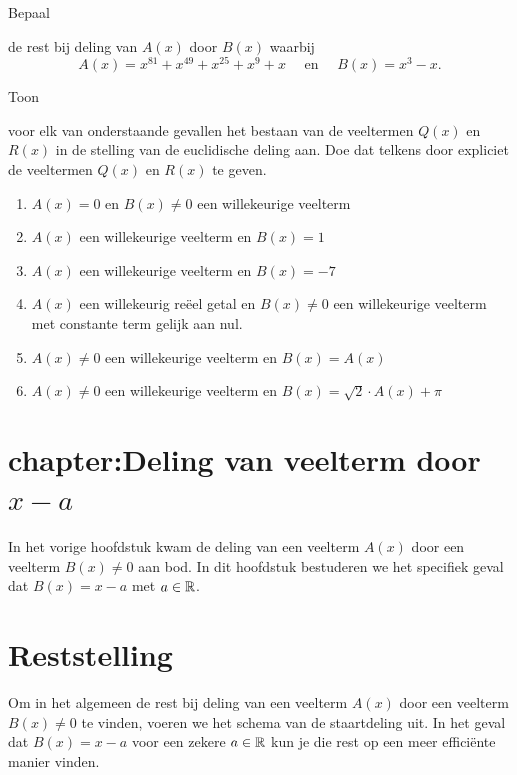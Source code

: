 \documentclass{ximera}
\begin{document}
\begin{Oefening}\setcounter{enumi}{19}
\hypertarget{oef2.19}{Bepaal} de rest bij deling van $A(x)$ door $B(x)$ waarbij
\[
A(x) = x^{81} + x^{49} + x^{25} + x^{9} + x \quad \text{ en } \quad B(x) = x^3-x.
\]
\end{Oefening}

\begin{Oefening}\setcounter{enumi}{20}
\hypertarget{oef2.20}{Toon} voor elk van onderstaande gevallen het bestaan van de veeltermen $Q(x)$ en $R(x)$ in de stelling van de euclidische deling aan. Doe dat telkens door expliciet de veeltermen $Q(x)$ en $R(x)$ te geven. 
\begin{enumerate}
\item
$A(x) = 0$ en $B(x) \neq 0$ een willekeurige veelterm 
\item
$A(x)$ een willekeurige veelterm en $B(x) = 1$
\item
$A(x)$ een willekeurige veelterm en $B(x) = -7$
\item
$A(x)$ een willekeurig re\"eel getal en $B(x) \neq 0$ een willekeurige veelterm met constante term gelijk aan nul.
\item
$A(x) \neq 0$ een willekeurige veelterm en $B(x) = A(x)$
\item
$A(x) \neq 0$ een willekeurige veelterm en $B(x) = \sqrt{2}\cdot A(x)+\pi$
\end{enumerate}
\end{Oefening}

\section{chapter:Deling van veelterm door \texorpdfstring{$x-a$}{x-a}}

In het vorige hoofdstuk kwam de deling van een veelterm $A(x)$ door een veelterm $B(x) \neq 0$ aan bod. In dit hoofdstuk bestuderen we het specifiek geval dat $B(x) = x-a$ met $a \in \mathbb{R}$.

\section{Reststelling}

Om in het algemeen de rest bij deling van een veelterm $A(x)$ door een veelterm $B(x) \neq 0$ te vinden, voeren we het schema van de staartdeling uit. In het geval dat $B(x) = x-a$ voor een zekere $a \in \mathbb{R}$ kun je die rest op een meer effici\"ente manier vinden.
\end{document}
